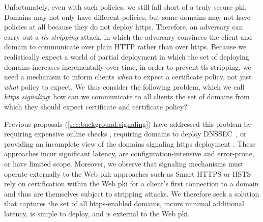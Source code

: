 
Unfortunately, even with such policies, we still fall short of a truly secure
\ac{pki}. Domains may not only have different policies, but some domains may not
have policies at all because they do not deploy \ac{https}. Therefore, an
adversary can carry out a \emph{\ac{tls} stripping} attack, in which the
adversary convinces the client and domain to communicate over plain HTTP rather
than over \ac{https}. Because we realistically expect a world of partial
deployment in which the set of deploying domains increases incrementally over
time, in order to prevent \ac{tls} stripping, we need a mechanism to inform
clients \emph{when} to expect a certificate policy, not just \emph{what} policy
to expect. We thus consider the following problem, which we call
\emph{\ac{https} signaling}: how can we communicate to all clients the set of
domains from which they should expect  certificate and certificate
policy?

Previous proposals (\autoref{sec:background:signaling}) have addressed this
problem by requiring expensive online checks , requiring
domains to deploy DNSSEC~\cite{rfc6698}, or providing an incomplete view of the
domains signaling \ac{https} deployment . These approaches incur significant latency, are
configuration-intensive and error-prone, or have limited scope. Moreover, we
observe that signaling mechanisms must operate externally to the Web \ac{pki}:
approaches such as Smart HTTPS or HSTS rely on certification within the Web
\ac{pki} for a client's first connection to a domain and thus are themselves
subject to stripping attacks. We therefore seek a solution that captures the set
of all \ac{https}-enabled domains, incurs minimal additional latency, is simple
to deploy, and is external to the Web \ac{pki}.

